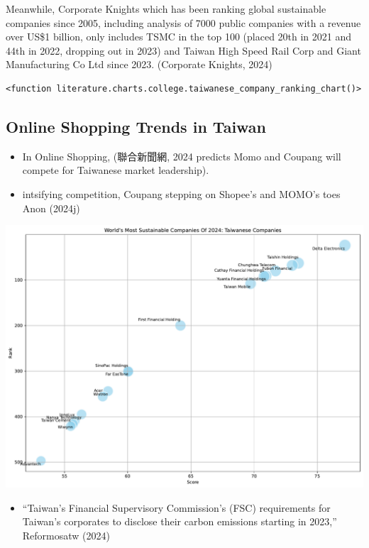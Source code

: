\documentclass[
  letterpaper,
  DIV=11,
  numbers=noendperiod]{scrartcl}
\providecommand{\tightlist}{%
  \setlength{\itemsep}{0pt}\setlength{\parskip}{0pt}}\usepackage{longtable,booktabs,array}
\begin{document}
Meanwhile, Corporate Knights which has been ranking global sustainable
companies since 2005, including analysis of 7000 public companies with a
revenue over US\$1 billion, only includes TSMC in the top 100 (placed
20th in 2021 and 44th in 2022, dropping out in 2023) and Taiwan High
Speed Rail Corp and Giant Manufacturing Co Ltd since 2023. (Corporate
Knights, 2024)

\begin{verbatim}
<function literature.charts.college.taiwanese_company_ranking_chart()>
\end{verbatim}

\subsection{Online Shopping Trends in
Taiwan}\label{online-shopping-trends-in-taiwan}

\begin{itemize}
\tightlist
\item
  In Online Shopping, (聯合新聞網, 2024 predicts Momo and Coupang will
  compete for Taiwanese market leadership).
\item
  intsifying competition, Coupang stepping on Shopee's and MOMO's toes
  Anon (2024j)
\end{itemize}

\includegraphics{_thesis_files/figure-pdf/cell-9-output-1.pdf}

\begin{itemize}
\tightlist
\item
  ``Taiwan's Financial Supervisory Commission's (FSC) requirements for
  Taiwan's corporates to disclose their carbon emissions starting in
  2023,'' Reformosatw (2024)
\end{itemize}
\end{document}
